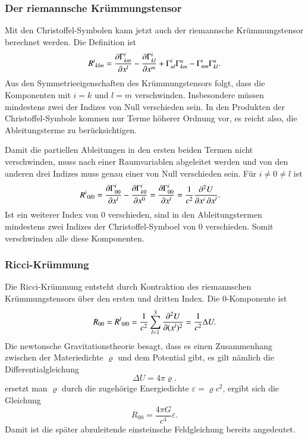 \subsubsection{Der riemannsche Krümmungstensor}
Mit den Christoffel-Symbolen kann jetzt auch der riemannsche Krümmungstensor
berechnet werden.
Die Definition ist
\begin{equation}
R^{i}\mathstrut_{klm}
=
\frac{\partial \Gamma^i_{km}}{\partial x^l}
-
\frac{\partial \Gamma^i_{kl}}{\partial x^m}
+
\Gamma^i_{nl}
\Gamma^n_{km}
-
\Gamma^i_{nm}
\Gamma^n_{kl}.
\end{equation}
Aus den Symmetrieeigenschaften des Krümmungstensors folgt, dass die
Komponenten mit $i=k$ und $l=m$ verschwinden.
Insbesondere müssen mindestens zwei der Indizes von Null verschieden sein.
In den Produkten der Christoffel-Symbole kommen nur Terme höherer Ordnung
vor, es reicht also, die Ableitungsterme zu berücksichtigen.

Damit die partiellen Ableitungen in den ersten beiden Termen nicht
verschwinden, muss nach einer Raumvariablen abgeleitet werden und von
den anderen drei Indizes muss genau einer von Null verschieden sein.
Für $i\ne 0\ne l$ ist
\begin{align}
R^i\mathstrut_{0l0}
&=
\frac{\partial \Gamma^i_{00}}{\partial x^l}
-
\frac{\partial \Gamma^i_{k0}}{\partial x^0}
=
\frac{\partial \Gamma^i_{00}}{\partial x^l}
=
\frac{1}{c^2}
\frac{\partial^2 U}{\partial x^i\,\partial x^l}.
\label{buch:kruemmung:newton:eqn:riemann}
\end{align}
Ist ein weiterer Index von 0 verschieden, sind in den Ableitungstermen
mindestens zwei Indizes der Christoffel-Symboel von 0 verschieden.
Somit verschwinden alle diese Komponenten.

\subsubsection{Ricci-Krümmung}
Die Ricci-Krümmung entsteht durch Kontraktion des riemannschen
Krümmungstensors über den ersten und dritten Index.
Die 0-Komponente ist
\[
R_{00}
=
R^l\mathstrut_{0l0}
=
\frac{1}{c^2}
\sum_{l=1}^3
\frac{\partial^2 U}{\partial (x^l)^2}
=
\frac{1}{c^2}\Delta U.
\]
Die newtonsche Gravitationstheorie besagt, dass es einen Zusammenhang
zwischen der Materiedichte $\varrho$ und dem Potential gibt, es gilt
nämlich die Differentialgleichung
\[
\Delta U = 4\pi \varrho.
\]
ersetzt man $\varrho$ durch die zugehörige Energiedichte
$\varepsilon = \varrho c^2$, ergibt sich die Gleichung
\[
R_{00}
=
\frac{4\pi G}{c^4}\varepsilon.
\]
Damit ist die später abzuleitende einsteinsche Feldgleichung bereits
angedeutet.

